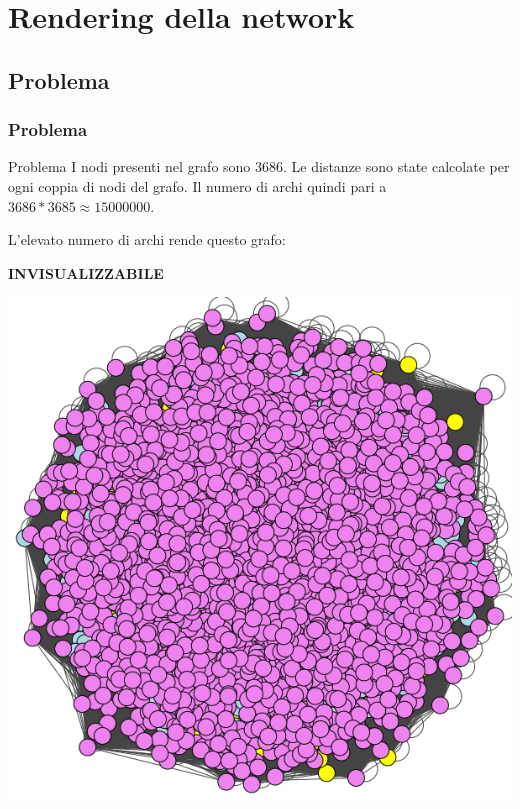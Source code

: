 \documentclass{beamer}
\begin{document}
\section{Rendering della network}
\subsection{Problema}
\begin{frame}
\frametitle{Problema}
\begin{alertblock}{Problema}
I nodi presenti nel grafo sono 3686.
Le distanze sono state calcolate per ogni coppia di nodi del grafo. Il numero di archi  quindi pari a $3686 * 3685 \approx 15000000$.
\end{alertblock}
L'elevato numero di archi rende questo grafo:\\
\begin{center}
\textbf{INVISUALIZZABILE}
\end{center}
\end{frame}

\begin{frame}
\begin{center}
\includegraphics[scale=0.3]{img/inside.png} 
\end{center}
\end{frame}
\end{document}
